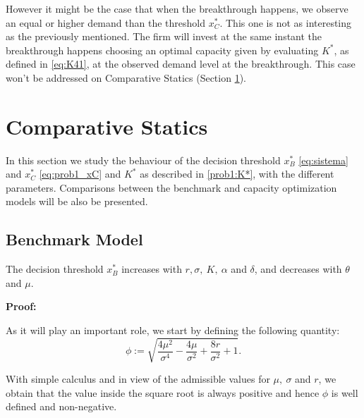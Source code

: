 However it might be the case that when the breakthrough happens, we observe an equal or higher demand than the threshold $x^*_C$. This one is not as interesting as the previously mentioned. The firm will invest at the same instant the breakthrough happens choosing an optimal capacity given by evaluating $K^*$, as defined in \eqref{eq:K41}, at the observed demand level at the breakthrough. This case won't be addressed on Comparative Statics (Section \ref{prob1:cs}).





\section{Comparative Statics}
\label{prob1:cs}

In this section we study the behaviour of the decision threshold $x^*_B$ \eqref{eq:sistema} and $x^*_{C}$ \eqref{eq:prob1_xC} and $K^*$ as described in \eqref{prob1:K*}, with
the different parameters. Comparisons between the benchmark and capacity optimization models will be also be presented.

\subsection{Benchmark Model}

\begin{prop}
	\label{1_prop1}
The decision threshold $x^*_B$ increases with $r, \sigma, \ K, \ \alpha$ and  $\delta$, and decreases with $\theta$ and $\mu$.
\end{prop}

\textbf{Proof:}

As it will play an important role, we start by defining the following quantity:
\begin{equation}
\phi:=\sqrt{\frac{4 \mu ^2}{\sigma ^4}-\frac{4 \mu }{\sigma ^2}+\frac{8 r}{\sigma ^2}+1}.
\label{phi}
\end{equation}

With simple calculus and in view of the admissible values for $\mu, \ \sigma$ and $r$, we obtain that the value inside the square root is always positive and hence $\phi$ is well defined and non-negative.

